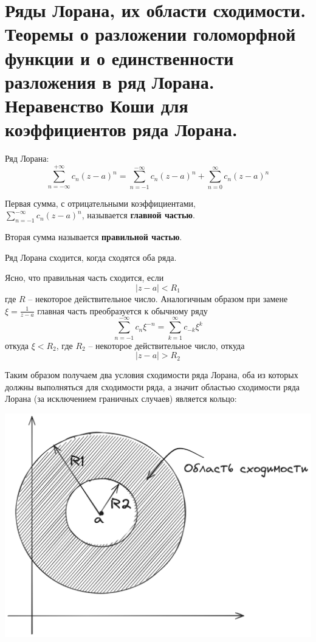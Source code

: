 \newpage
\section{Ряды Лорана, их области сходимости. Теоремы о разложении голоморфной функции и о единственности разложения в ряд Лорана. Неравенство Коши для коэффициентов ряда Лорана.}

Ряд Лорана:
$$
\sum\limits_{n=-\infty}^{+\infty} c_n(z-a)^n = \sum\limits_{n=-1}^{-\infty}c_n(z-a)^n + \sum\limits_{n=0}^{\infty}c_n(z-a)^n
$$

Первая сумма, с отрицательными коэффициентами,\\ $\sum\limits_{n=-1}^{-\infty}c_n(z-a)^n$, называется \textbf{главной частью}.

Вторая сумма называется \textbf{правильной частью}.

Ряд Лорана сходится, когда сходятся оба ряда.

Ясно, что правильная часть сходится, если  
$$|z - a| < R_1$$
где $R$ -- некоторое действительное число.
Аналогичным образом при замене $\xi = \frac{1}{z - a}$ главная часть преобразуется к обычному ряду
$$
\sum\limits_{n=-1}^{-\infty}c_n\xi^{-n}=\sum\limits_{k=1}^{\infty}c_{-k}\xi^{k}
$$
откуда $\xi<R_2$, где $R_2$ -- некоторое действительное число, откуда
$$|z - a| > R_2$$

Таким образом получаем два условия сходимости ряда Лорана, оба из которых должны выполняться для сходимости ряда, а значит областью сходимости ряда Лорана (за исключением граничных случаев) является кольцо:

\begin{center}
\includegraphics[scale=0.3]{answers/img/rng.png}
\end{center}

